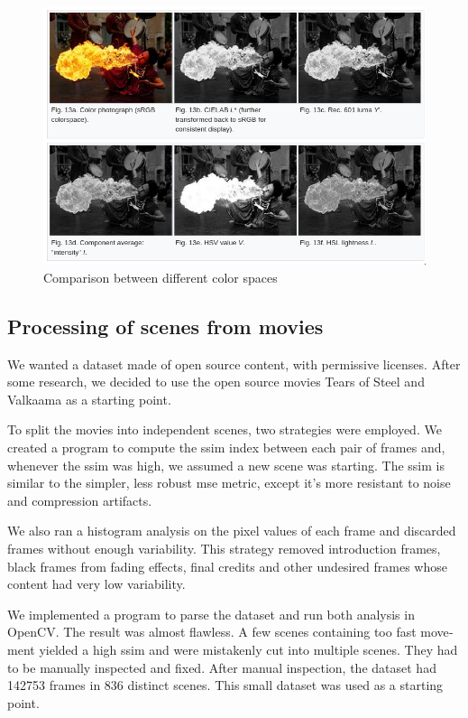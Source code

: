 \documentclass[12pt,openright,oneside,a4paper,english]{abntex2}
\begin{document}
\begin{otherlanguage}{english}
    \begin{figure}[!htb]
    \centering
    \includegraphics[width=\textwidth]{Colorspaces}
    \caption{Comparison between different color spaces \cite{wiki_HSV}}
    \label{hsl_hsv}
    \end{figure}

    \subsection{Processing of scenes from movies}

    We wanted a dataset made of open source content, with permissive licenses. After some research, we decided to use the open source movies Tears of Steel \cite{tears_of_steel_movie} and Valkaama \cite{valkaama_movie} as a starting point.

    To split the movies into independent scenes, two strategies were employed. We created a program to compute the \acrfull{ssim} index between each pair of frames and, whenever the \acrshort{ssim} was high, we assumed a new scene was starting. The \acrshort{ssim} is similar to the simpler, less robust \acrfull{mse} metric, except it's more resistant to noise and compression artifacts.

    We also ran a histogram analysis on the pixel values of each frame and discarded frames without enough variability. This strategy removed introduction frames, black frames from fading effects, final credits and other undesired frames whose content had very low variability.

    We implemented a program to parse the dataset and run both analysis in OpenCV. The result was almost flawless. A few scenes containing too fast movement yielded a high \acrshort{ssim} and were mistakenly cut into multiple scenes. They had to be manually inspected and fixed. After manual inspection, the dataset had 142753 frames in 836 distinct scenes. This small dataset was used as a starting point.


\end{otherlanguage}
\end{document}
